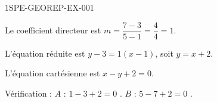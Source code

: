 \begin{corrige}{1SPE-GEOREP-EX-001}


\textbf{} Le coefficient directeur est $m = \dfrac{7 - 3}{5 - 1} = \dfrac{4}{4} = 1$.

L'équation réduite est $y - 3 = 1(x - 1)$, soit $y = x + 2$.

L'équation cartésienne est $\boxed{x - y + 2 = 0}$.

Vérification : $A$ : $1 - 3 + 2 = 0$ \checkmark. $B$ : $5 - 7 + 2 = 0$ \checkmark.

\end{corrige}
